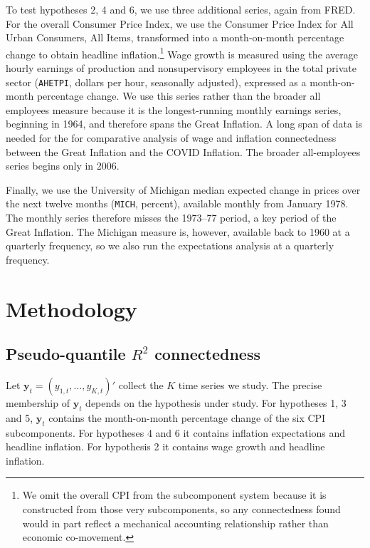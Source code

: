 \documentclass{article}
\begin{document}

To test hypotheses 2, 4 and 6, we use three additional series, again from FRED. For the overall Consumer
Price Index, we use the Consumer Price Index for All Urban Consumers, All Items, transformed into a
month-on-month percentage change to obtain headline inflation.\footnote{We omit the overall CPI from the subcomponent system because it is constructed from those very subcomponents, so any connectedness found would in part reflect a mechanical accounting relationship rather than economic co-movement.} Wage growth is measured using the average hourly earnings of production and nonsupervisory employees in the total private sector
(\texttt{AHETPI}, dollars per hour, seasonally adjusted), expressed as a
month-on-month percentage change. We use this series rather than the broader
all employees measure because it is the longest-running monthly earnings series,
beginning in 1964, and therefore spans the Great Inflation. A long span of data is needed for the
for comparative analysis of wage and inflation connectedness between the Great Inflation and the COVID Inflation. The broader
all-employees series begins only in 2006.

Finally, we use the University of Michigan median expected change in prices over the next twelve
months (\texttt{MICH}, percent), available monthly from January 1978. The monthly series therefore
misses the 1973--77 period, a key period of the Great Inflation. The Michigan measure is, however, available
back to 1960 at a quarterly frequency, so we also run the expectations analysis at a quarterly frequency.
   
    


\section{Methodology}\label{sec:method}

\subsection{Pseudo-quantile $R^2$ connectedness}


Let $\bm{y}_t=(y_{1,t},\dots,y_{K,t})'$ collect the $K$ time series we study. The precise membership of $\bm{y}_t$ depends on the hypothesis under study. For hypotheses 1, 3 and 5, $\bm{y}_t$ contains the month-on-month percentage change of the six CPI subcomponents. For hypotheses 4 and 6 it contains inflation expectations and headline inflation. For hypothesis 2 it contains wage growth  and headline inflation.
\end{document}
